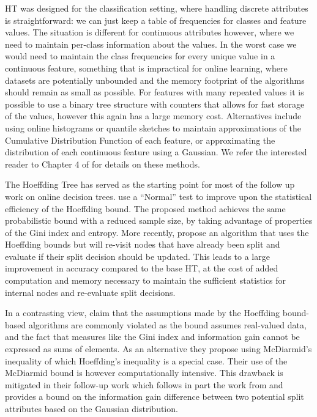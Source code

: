 HT was designed for the classification setting, where handling discrete attributes
is straightforward: we can just keep a table of frequencies for classes and feature
values. The situation
is different for continuous attributes however, where we need to maintain per-class
information about the values. In the worst case we would need to maintain the class
frequencies for every unique value in a continuous feature, something that is impractical
for online learning, where datasets are potentially unbounded and the memory footprint
of the algorithms should remain as small as possible. For features with many repeated
values it is possible to use a binary tree structure with counters that allows for
fast storage of the values, however this again has a large memory cost. Alternatives include
using online histograms or quantile sketches \cite{greenwald2016quantiles}
to maintain approximations of the Cumulative Distribution Function of
each feature, or approximating the distribution of each continuous feature using a Gaussian.
We refer the interested reader to Chapter 4 of \citet{data-stream-mining} for details on these methods.

The Hoeffding Tree has served as the starting point for most of the follow up work on
online decision trees. \citet{vfdt-normal} use a ``Normal'' test to improve
upon the statistical efficiency of the Hoeffding bound. The proposed method achieves
the same probabilistic bound with a reduced sample size, by taking
advantage of properties of the Gini index and entropy. More recently,
\citet{efdt} propose an algorithm that uses the Hoeffding bounds but
will re-visit nodes that have already been split and evaluate if their
split decision should be updated. This leads to a large improvement in accuracy
compared to the base HT,
at the cost of added computation and memory necessary to maintain
the sufficient statistics for internal nodes and re-evaluate split
decisions.

In a contrasting view, \citet{vfdt-mcdiarmid} claim that the assumptions made
by the Hoeffding bound-based algorithms are commonly violated as the bound assumes
real-valued data, and the fact that measures like the Gini index and information
gain cannot be expressed as sums of elements. As an alternative they propose
using McDiarmid's inequality of which Hoeffding's inequality is a special case.
Their use of the McDiarmid
bound is however computationally intensive. This drawback is mitigated
in their follow-up work \cite{vfdt-gaussian} which follows in part the work from \citet{vfdt-normal}
and provides a bound on the information gain difference between two potential
split attributes based on the Gaussian distribution.


